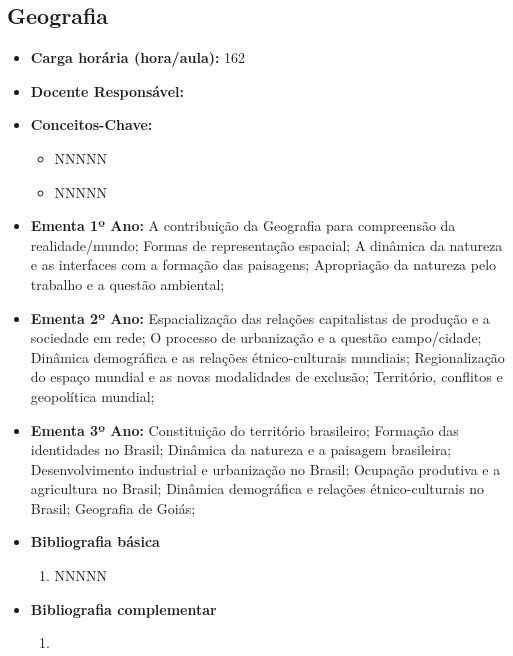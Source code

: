 \documentclass[11pt,fleqn]{book} %
\begin{document}
\subsection{Geografia}\label{disc:geografia}
\begin{itemize}
	\item \textbf{Carga horária (hora/aula):} 162
	\item \textbf{Docente Responsável:}
	\item \textbf{Conceitos-Chave:}
	\begin{itemize}
		\item NNNNN
		\item NNNNN
	\end{itemize}
	\item \textbf{Ementa 1º Ano:} 
	A contribuição da Geografia para compreensão da realidade/mundo;
	Formas de representação espacial;
	A dinâmica da natureza e as interfaces com a formação das paisagens;
	Apropriação da natureza pelo trabalho e a questão ambiental;
	\item \textbf{Ementa 2º Ano:} 	
	Espacialização das relações capitalistas de produção e a sociedade em rede;
	O processo de urbanização e a questão campo/cidade;
	Dinâmica demográfica e as relações étnico-culturais mundiais;
	Regionalização do espaço mundial e as novas modalidades de exclusão;
	Território, conflitos e geopolítica mundial;
	\item \textbf{Ementa 3º Ano:} 	
	Constituição do território brasileiro;
	Formação das identidades no Brasil; 
	Dinâmica da natureza e a paisagem brasileira;
	Desenvolvimento industrial e urbanização no Brasil;
	Ocupação produtiva e a agricultura no Brasil; 
	Dinâmica demográfica e relações étnico-culturais no Brasil;
	Geografia de Goiás;
	\item \textbf{Bibliografia básica}
	\begin{enumerate}
		\item NNNNN
	\end{enumerate}
	\item \textbf{Bibliografia complementar}
	\begin{enumerate}
		\item 
	\end{enumerate}	
\end{itemize}

\newpage
\end{document}

